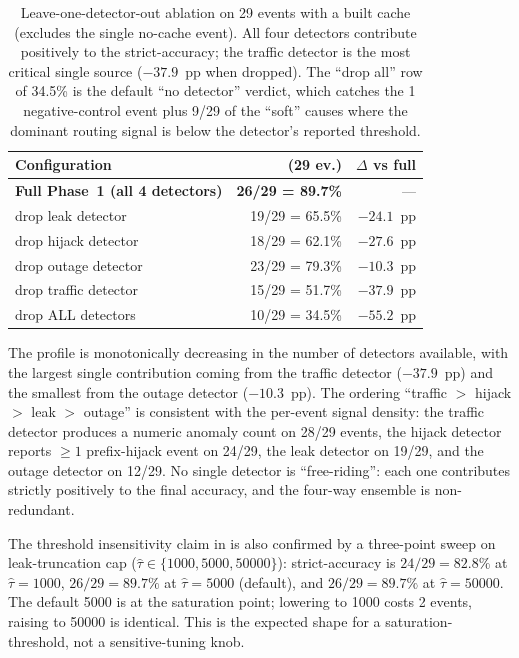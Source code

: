 \begin{table}[t][h]
\centering
\caption{Leave-one-detector-out ablation on 29
events with a built cache (excludes the single no-cache
event). All four detectors contribute positively to
the strict-accuracy; the traffic detector is the most
critical single source ($-37.9$~pp when dropped). The
\enquote{drop all} row of 34.5\% is the default
\enquote{no detector} verdict, which catches the 1
negative-control event plus 9/29 of the \enquote{soft}
causes where the dominant routing signal is below the
detector's reported threshold.}
\label{tab:detector-ablation}
\small
\setlength{\tabcolsep}{4pt}
\begin{tabular}{p{}rr}
\hline
Configuration & \strict{} (29 ev.) & $\Delta$ vs full \\
\hline
\textbf{Full Phase~1 (all 4 detectors)} &
\textbf{26/29 = 89.7\%} & --- \\
\quad drop leak detector & 19/29 = 65.5\% & $-24.1$~pp \\
\quad drop hijack detector & 18/29 = 62.1\% & $-27.6$~pp \\
\quad drop outage detector & 23/29 = 79.3\% & $-10.3$~pp \\
\quad drop traffic detector & 15/29 = 51.7\% & $-37.9$~pp \\
\quad drop ALL detectors & 10/29 = 34.5\% & $-55.2$~pp \\
\hline
\end{tabular}
\end{table}

The profile is monotonically decreasing in the number of
detectors available, with the largest single contribution
coming from the traffic detector ($-37.9$~pp) and the
smallest from the outage detector ($-10.3$~pp). The
ordering \enquote{traffic $>$ hijack $>$ leak $>$ outage}
is consistent with the per-event signal density:
the traffic detector produces a numeric anomaly count
on 28/29 events, the hijack detector reports
$\geq 1$ prefix-hijack event on 24/29, the leak detector
on 19/29, and the outage detector on 12/29. No single
detector is \enquote{free-riding}: each one contributes
strictly positively to the final accuracy, and the four-way
ensemble is non-redundant.

The threshold insensitivity claim in
 is also confirmed by a
three-point sweep on leak-truncation cap
(\(\hat{\tau} \in \{1000, 5000, 50000\}\)):
strict-accuracy is \(24/29 = 82.8\%\) at \(\hat{\tau}{=}1000\),
\(26/29 = 89.7\%\) at \(\hat{\tau}{=}5000\) (default), and
\(26/29 = 89.7\%\) at \(\hat{\tau}{=}50000\). The default
5000 is at the saturation point; lowering to 1000 costs
2 events, raising to 50000 is identical. This is the
expected shape for a saturation-threshold, not a
sensitive-tuning knob.

